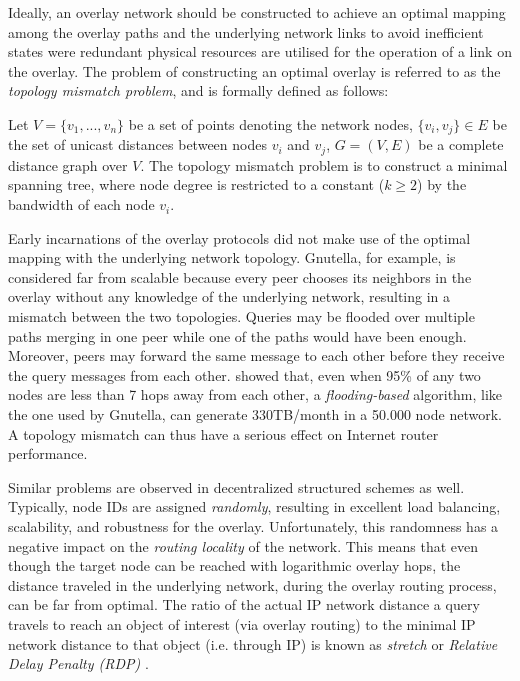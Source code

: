 Ideally, an overlay network should be constructed to achieve an optimal 
mapping among the overlay paths and the underlying network links to avoid
inefficient states were redundant physical resources are utilised for the
operation of a link on the overlay. The problem of constructing an optimal
overlay is referred to as the \emph{topology mismatch problem}, and is formally
defined as follows:
\begin{definition}
Let $V = \{v_1, ..., v_n\}$ be a set of points denoting the network nodes,
$\{v_i, v_j\} \in E$ be the set of unicast distances between nodes $v_i$ and
$v_j$, $G=(V,E)$ be a complete distance graph over $V$. The topology mismatch
problem is to construct a minimal spanning tree, where node degree is
restricted to a constant ($k\geq 2$) by the bandwidth of each node $v_i$.
\end{definition}

Early incarnations of the overlay protocols did not make use of the optimal
mapping with the underlying network topology. Gnutella, for example, is
considered far from scalable \cite{ritter_gnucantscale_2001} because every peer
chooses its neighbors in the overlay without any knowledge of the underlying
network, resulting in a mismatch between the two topologies. Queries may be
flooded over multiple paths merging in one peer while one of the paths would
have been enough. Moreover, peers may forward the same message to each other
before they receive the query messages from each other.
\cite{matei_mapgnutella_2002} showed that, even when 95\% of any two nodes are
less than 7 hops away from each other, a \emph{flooding-based} algorithm, like
the one used by Gnutella, can generate 330TB/month in a 50.000 node network. A
topology mismatch can thus have a serious effect on Internet router performance.

Similar problems are observed in decentralized structured schemes as well.
Typically, node IDs are assigned \emph{randomly}, resulting in excellent load
balancing, scalability, and robustness for the overlay. Unfortunately, this
randomness has a negative impact on the \emph{routing locality} of the network.
This means that even though the target node can be reached with logarithmic
overlay hops, the distance traveled in the underlying network, during the
overlay routing process, can be far from optimal.  The ratio of the actual IP
network distance a query travels to reach an object of interest (via overlay
routing) to the minimal IP network distance to that object (i.e. through IP) is
known as \emph{stretch} or \emph{Relative Delay Penalty (RDP)} \cite{CRZ2000}.

